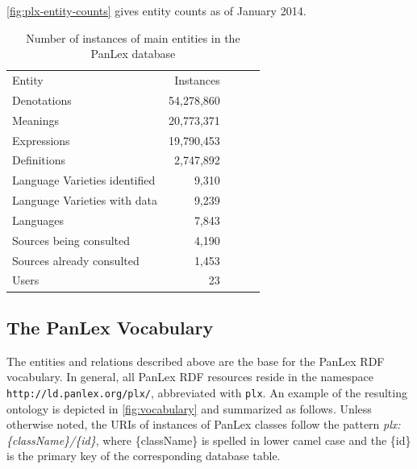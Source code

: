 \documentclass[sw]{iosart2c}
\begin{document}
\autoref{fig:plx-entity-counts} gives entity counts as of January 2014.
\begin{table}
  \centering\begin{scriptsize}
  \begin{tabular}{lrclr}
    Entity             & Instances  \\
    \cline{1-2}
    Denotations        & 54,278,860 \\  %
    Meanings           & 20,773,371 \\  %
    Expressions        & 19,790,453 \\ %
    Definitions        &  2,747,892 \\ %
    Language Varieties identified           &      9,310 \\  %
    Language Varieties with data           &      9,239 \\  %
    Languages          &      7,843 \\ %
    Sources being consulted   &      4,190 \\  %
    Sources already consulted &      1,453 \\  %
    Users              &          23 \\ %
  \end{tabular}
  \end{scriptsize}
  \caption{Number of instances of main entities in the PanLex database}
  \label{fig:plx-entity-counts}
\end{table}

\subsection{The PanLex Vocabulary}
\label{sec:vocabulary}
The entities and relations described above are the base for the PanLex RDF vocabulary.
In general, all PanLex RDF resources reside in the namespace \texttt{\small{http://ld.panlex.org/plx/}}, abbreviated with \texttt{\small{plx}}.
An example of the resulting ontology is depicted in \autoref{fig:vocabulary} and summarized as follows.
Unless otherwise noted, the URIs of instances of PanLex classes follow the pattern \emph{plx:\{className\}/\{id\}}, where \{className\} is spelled in lower camel case and the \{id\} is the primary key of the corresponding database table.
\end{document}
